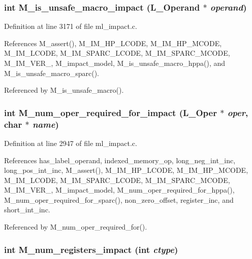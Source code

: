 \subsubsection{\setlength{\rightskip}{0pt plus 5cm}int M\_\-is\_\-unsafe\_\-macro\_\-impact (L\_\-Operand $\ast$ {\em operand})}\label{ml__impact_8c_22fa0d2a24d08297ee923a6cffc326f3}




Definition at line 3171 of file ml\_\-impact.c.

References M\_\-assert(), M\_\-IM\_\-HP\_\-LCODE, M\_\-IM\_\-HP\_\-MCODE, M\_\-IM\_\-LCODE, M\_\-IM\_\-SPARC\_\-LCODE, M\_\-IM\_\-SPARC\_\-MCODE, M\_\-IM\_\-VER\_, M\_\-impact\_\-model, M\_\-is\_\-unsafe\_\-macro\_\-hppa(), and M\_\-is\_\-unsafe\_\-macro\_\-sparc().

Referenced by M\_\-is\_\-unsafe\_\-macro().
\subsubsection{\setlength{\rightskip}{0pt plus 5cm}int M\_\-num\_\-oper\_\-required\_\-for\_\-impact (L\_\-Oper $\ast$ {\em oper}, char $\ast$ {\em name})}\label{ml__impact_8c_ee715afcd59360f0d1467b13415120cd}




Definition at line 2947 of file ml\_\-impact.c.

References has\_\-label\_\-operand, indexed\_\-memory\_\-op, long\_\-neg\_\-int\_\-inc, long\_\-pos\_\-int\_\-inc, M\_\-assert(), M\_\-IM\_\-HP\_\-LCODE, M\_\-IM\_\-HP\_\-MCODE, M\_\-IM\_\-LCODE, M\_\-IM\_\-SPARC\_\-LCODE, M\_\-IM\_\-SPARC\_\-MCODE, M\_\-IM\_\-VER\_, M\_\-impact\_\-model, M\_\-num\_\-oper\_\-required\_\-for\_\-hppa(), M\_\-num\_\-oper\_\-required\_\-for\_\-sparc(), non\_\-zero\_\-offset, register\_\-inc, and short\_\-int\_\-inc.

Referenced by M\_\-num\_\-oper\_\-required\_\-for().
\subsubsection{\setlength{\rightskip}{0pt plus 5cm}int M\_\-num\_\-registers\_\-impact (int {\em ctype})}\label{ml__impact_8c_e7dac71a49e2df3df50be0a15d306bca}




